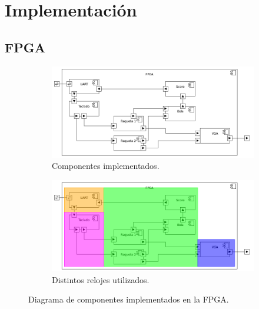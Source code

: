 \section{Implementación}
\label{s3:sec:Implementacion}


\subsection{FPGA}
\label{s3:subsec:fpga}

\begin{figure}
\centering
\begin{subfigure}{.5\textwidth}
  \centering
  \includegraphics[width=1.0\textwidth]{images/fpga_componentes.png}
  \caption{Componentes implementados.}
  \label{s3:fig:componentes-fpga-a}
\end{subfigure}%
\begin{subfigure}{.5\textwidth}
  \centering
  \includegraphics[width=1.0\textwidth]{images/fpga_componentes_timing.png}
  \caption{Distintos relojes utilizados.}
  \label{s3:fig:componentes-fpga-clocking}
\end{subfigure}
\caption{Diagrama de componentes implementados en la FPGA. }
\label{s3:fig:componentes-fpga-a}
\end{figure}



